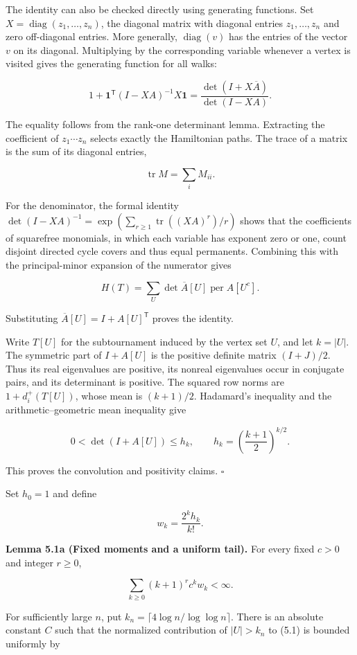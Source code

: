 \documentclass[11pt,a4paper]{article}
\begin{document}
The identity can also be checked directly using generating functions. Set \(X=\operatorname{diag}(z_1,\ldots,z_n)\), the diagonal matrix with diagonal entries \(z_1,\ldots,z_n\) and zero off-diagonal entries. More generally, \(\operatorname{diag}(v)\) has the entries of the vector \(v\) on its diagonal. Multiplying by the corresponding variable whenever a vertex is visited gives the generating function for all walks:

\[
1+\mathbf1^{\mathsf T}(I-XA)^{-1}X\mathbf1
=\frac{\det(I+X\overline A)}{\det(I-XA)}.
\]

The equality follows from the rank-one determinant lemma. Extracting the coefficient of \(z_1\cdots z_n\) selects exactly the Hamiltonian paths. The trace of a matrix is the sum of its diagonal entries,

\[
\operatorname{tr}M=\sum_iM_{ii}.
\]

For the denominator, the formal identity \(\det(I-XA)^{-1}=\exp(\sum_{r\ge1}\operatorname{tr}((XA)^r)/r)\) shows that the coefficients of squarefree monomials, in which each variable has exponent zero or one, count disjoint directed cycle covers and thus equal permanents. Combining this with the principal-minor expansion of the numerator gives

\[
H(T)=\sum_U\det\overline A[U]\operatorname{per}A[U^c].
\]

Substituting \(\overline A[U]=I+A[U]^{\mathsf T}\) proves the identity.

Write \(T[U]\) for the subtournament induced by the vertex set \(U\), and let \(k=|U|\). The symmetric part of \(I+A[U]\) is the positive definite matrix \((I+J)/2\). Thus its real eigenvalues are positive, its nonreal eigenvalues occur in conjugate pairs, and its determinant is positive. The squared row norms are \(1+d_i^+(T[U])\), whose mean is \((k+1)/2\). Hadamard's inequality and the arithmetic--geometric mean inequality give

\[
0<\det(I+A[U])\le h_k,\qquad h_k=\left(\frac{k+1}{2}\right)^{k/2}.
\]

This proves the convolution and positivity claims. \(\square\)

Set \(h_0=1\) and define

\[
w_k=\frac{2^k h_k}{k!}.
\]

\textbf{Lemma 5.1a (Fixed moments and a uniform tail).} For every fixed \(c>0\) and integer \(r\ge0\),

\[
\sum_{k\ge0}(k+1)^r c^kw_k<\infty.
\]

For sufficiently large \(n\), put \(k_n=\lceil4\log n/\log\log n\rceil\). There is an absolute constant \(C\) such that the normalized contribution of \(|U|>k_n\) to (5.1) is bounded uniformly by
\end{document}
